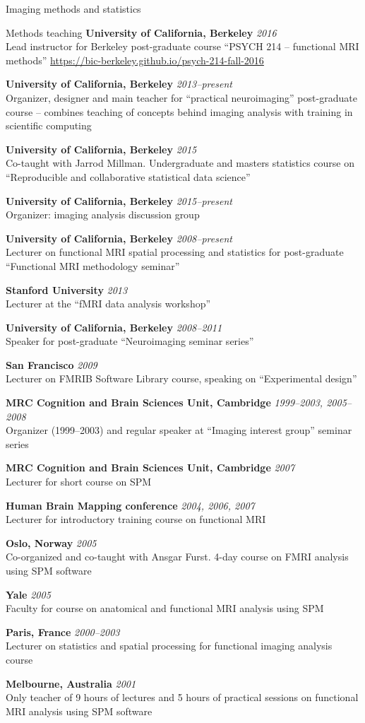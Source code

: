 \documentclass{cv}
\newcommand{\PlaceDateNote}[3]{{\bf #1} \hfill {\em #2} \\#3}
\newcommand{\UCB}{University of California, Berkeley}
\newcommand{\CBU}{MRC Cognition and Brain Sciences Unit, Cambridge}
\begin{document}
\begin{cvSection}{Imaging methods and statistics}
\begin{cvSubSection}{Methods teaching}
\PlaceDateNote{\UCB}{2016}
{Lead instructor for Berkeley post-graduate course ``PSYCH 214 -- functional
MRI methods'' \url{https://bic-berkeley.github.io/psych-214-fall-2016}}

\PlaceDateNote{\UCB}{2013--present}
{Organizer, designer and main teacher for ``practical neuroimaging''
post-graduate course -- combines teaching of concepts behind imaging analysis
with training in scientific computing}

\PlaceDateNote{\UCB}{2015}
{Co-taught with Jarrod Millman.  Undergraduate and masters statistics course
on ``Reproducible and collaborative statistical data science''}

\PlaceDateNote{\UCB}{2015--present}
{Organizer: imaging analysis discussion group}

\PlaceDateNote{\UCB}{2008--present}
{Lecturer on functional MRI spatial processing and statistics for
post-graduate ``Functional MRI methodology seminar''}

\PlaceDateNote{Stanford University}{2013}
{Lecturer at the ``fMRI data analysis workshop''}

\PlaceDateNote{\UCB}{2008--2011}
{Speaker for post-graduate ``Neuroimaging seminar series''}

\PlaceDateNote{San Francisco}{2009}
{Lecturer on FMRIB Software Library course, speaking on ``Experimental
design''}

\PlaceDateNote{\CBU}{1999--2003, 2005--2008}
{Organizer (1999--2003) and regular speaker at ``Imaging interest group''
seminar series}

\PlaceDateNote{\CBU}{2007}
{Lecturer for short course on SPM}

\PlaceDateNote{Human Brain Mapping conference}{2004, 2006, 2007}
{Lecturer for introductory training course on functional MRI}

\PlaceDateNote{Oslo, Norway}{2005}
{Co-organized and co-taught with Ansgar Furst. 4-day course on FMRI analysis
using SPM software}

\PlaceDateNote{Yale}{2005}
{Faculty for course on anatomical and functional MRI analysis using SPM}

\PlaceDateNote{Paris, France}{2000--2003}
{Lecturer on statistics and spatial processing for functional imaging analysis
course}

\PlaceDateNote{Melbourne, Australia}{2001}
{Only teacher of 9 hours of lectures and 5 hours of practical sessions on
functional MRI analysis using SPM software}

\end{cvSubSection}


\end{cvSection}
\end{document}
